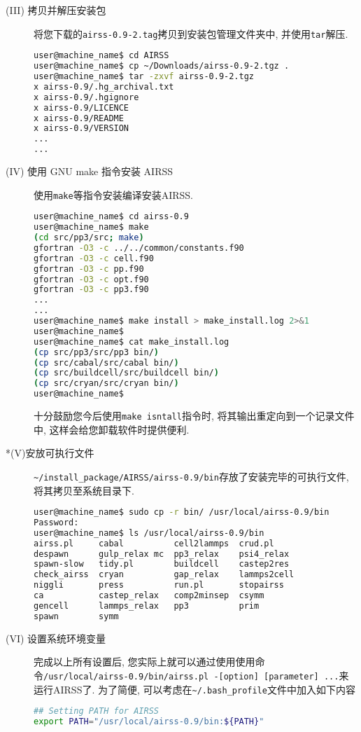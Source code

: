 \documentclass[a4paper, 10pt]{article}
\begin{document}
\begin{description}
\item [(III) 拷贝并解压安装包] 将您下载的\verb|airss-0.9-2.tag|拷贝到安装包管理文件夹中, 并使用\verb|tar|解压.
\begin{lstlisting}[language={bash}]
user@machine_name$ cd AIRSS
user@machine_name$ cp ~/Downloads/airss-0.9-2.tgz .
user@machine_name$ tar -zxvf airss-0.9-2.tgz
x airss-0.9/.hg_archival.txt
x airss-0.9/.hgignore
x airss-0.9/LICENCE
x airss-0.9/README
x airss-0.9/VERSION 
...
...
\end{lstlisting}

\item[(IV) 使用 GNU make 指令安装 AIRSS] 使用\verb|make|等指令安装编译安装AIRSS.
\begin{lstlisting}[language={bash}]
user@machine_name$ cd airss-0.9
user@machine_name$ make
(cd src/pp3/src; make)
gfortran -O3 -c ../../common/constants.f90
gfortran -O3 -c cell.f90
gfortran -O3 -c pp.f90
gfortran -O3 -c opt.f90
gfortran -O3 -c pp3.f90
...
...
user@machine_name$ make install > make_install.log 2>&1
user@machine_name$
user@machine_name$ cat make_install.log
(cp src/pp3/src/pp3 bin/)
(cp src/cabal/src/cabal bin/)
(cp src/buildcell/src/buildcell bin/)
(cp src/cryan/src/cryan bin/)
user@machine_name$
\end{lstlisting}

十分鼓励您今后使用\verb|make isntall|指令时, 将其输出重定向到一个记录文件中, 这样会给您卸载软件时提供便利.

\item[*(V)安放可执行文件] \verb|~/install_package/AIRSS/airss-0.9/bin|存放了安装完毕的可执行文件, 将其拷贝至系统目录下.
\begin{lstlisting}[language={bash}]
user@machine_name$ sudo cp -r bin/ /usr/local/airss-0.9/bin
Password:
user@machine_name$ ls /usr/local/airss-0.9/bin
airss.pl     cabal          cell2lammps  crud.pl      
despawn      gulp_relax mc  pp3_relax    psi4_relax   
spawn-slow   tidy.pl        buildcell    castep2res   
check_airss  cryan          gap_relax    lammps2cell  
niggli       press          run.pl       stopairss    
ca           castep_relax   comp2minsep  csymm        
gencell      lammps_relax   pp3          prim         
spawn        symm

\end{lstlisting}

\item[(VI) 设置系统环境变量] 完成以上所有设置后, 您实际上就可以通过使用使用命令\verb|/usr/local/airss-0.9/bin/airss.pl -[option] [parameter] ...|来运行AIRSS了. 为了简便, 可以考虑在\verb|~/.bash_profile|文件中加入如下内容
\begin{lstlisting}[language={bash}]
## Setting PATH for AIRSS
export PATH="/usr/local/airss-0.9/bin:${PATH}"
\end{lstlisting}


\end{description}
\end{document}
